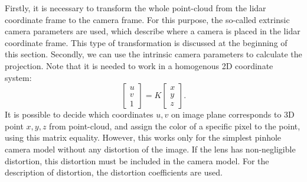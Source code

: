 Firstly, it is necessary to transform the whole point-cloud from the lidar coordinate frame to the camera frame. For this purpose, the so-called extrinsic camera parameters are used, which describe where a camera is placed in the lidar coordinate frame. This type of transformation is discussed at the beginning of this section. Secondly, we can use the intrinsic camera parameters to calculate the projection. Note that it is needed to work in a homogenous 2D coordinate system:
\begin{equation}
\begin{bmatrix}
u\\
v\\
1
\end{bmatrix}
= K \begin{bmatrix}
x\\
y\\
z
\end{bmatrix}.
\end{equation}
It is possible to decide which coordinates $u,v$ on image plane corresponds to 3D point $x,y,z$ from point-cloud, and assign the color of a specific pixel to the point, using this matrix equality. However, this works only for the simplest pinhole camera model without any distortion of the image. If the lens has non-negligible distortion, this distortion must be included in the camera model. For the description of distortion, the distortion coefficients are used.